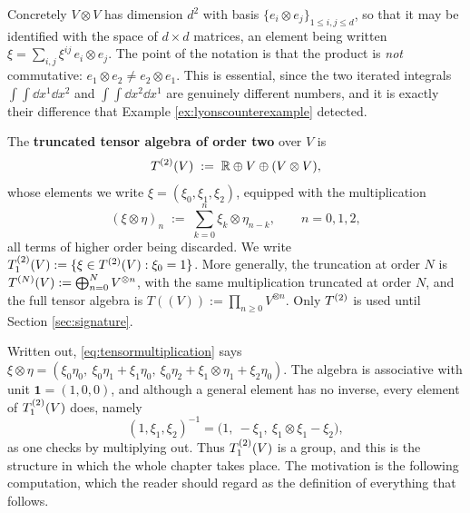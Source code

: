 Concretely $V\otimes V$ has dimension $d^2$ with basis $\{e_i\otimes e_j\}_{1\leq i,j\leq d}$, so
that it may be identified with the space of $d\times d$ matrices, an element being written
$\xi = \sum_{i,j}\xi^{ij}\,e_i\otimes e_j$. The point of the notation is that the product is
\emph{not} commutative: $e_1\otimes e_2 \neq e_2\otimes e_1$. This is essential, since the two
iterated integrals $\int\!\!\int \dd x^1\dd x^2$ and $\int\!\!\int \dd x^2 \dd x^1$ are genuinely
different numbers, and it is exactly their difference that Example \ref{ex:lyonscounterexample}
detected.

\begin{definition}\label{def:tensoralgebra}
The \textbf{truncated tensor algebra of order two} over $V$ is
\begin{equation}\label{eq:tensoralgebra}
T^{(2)}(V) \;:=\; \mathbb{R} \oplus V \oplus (V\otimes V),
\end{equation}
whose elements we write $\xi = (\xi_0,\xi_1,\xi_2)$, equipped with the multiplication
\begin{equation}\label{eq:tensormultiplication}
(\xi \otimes \eta)_n \;:=\; \sum_{k=0}^{n} \xi_k \otimes \eta_{n-k}, \qquad n = 0,1,2,
\end{equation}
all terms of higher order being discarded. We write
$T_{1}^{(2)}(V) := \{\xi \in T^{(2)}(V) : \xi_0 = 1\}$. More generally, the truncation at order $N$ is
$T^{(N)}(V) := \bigoplus_{n=0}^{N} V^{\otimes n}$, with the same multiplication truncated at order
$N$, and the full tensor algebra is $T((V)) := \prod_{n \geq 0} V^{\otimes n}$. Only $T^{(2)}$ is used until
Section \ref{sec:signature}.
\end{definition}

Written out, \eqref{eq:tensormultiplication} says
$\xi\otimes\eta = (\xi_0\eta_0,\ \xi_0\eta_1 + \xi_1\eta_0,\ \xi_0\eta_2 + \xi_1\otimes\eta_1 + \xi_2\eta_0)$.
The algebra is associative with unit $\mathbf{1} = (1,0,0)$, and although a general element has no
inverse, every element of $T_{1}^{(2)}(V)$ does, namely
\begin{equation}\label{eq:tensorinverse}
(1,\xi_1,\xi_2)^{-1} = \bigl(1,\ -\xi_1,\ \xi_1\otimes\xi_1 - \xi_2\bigr),
\end{equation}
as one checks by multiplying out. Thus $T_{1}^{(2)}(V)$ is a group, and this is the structure in which
the whole chapter takes place. The motivation is the following computation, which the reader should regard as the definition of
everything that follows.

